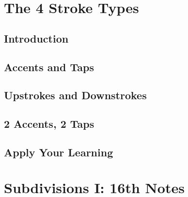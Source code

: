 \documentclass[12pt,letterpaper]{book}
\begin{document}




\section{The 4 Stroke Types}


\subsection{Introduction}

\subsection{Accents and Taps}

\subsection{Upstrokes and Downstrokes}

\subsection{2 Accents, 2 Taps}

\subsection{Apply Your Learning}

\section{Subdivisions I: 16th Notes}
\end{document}
